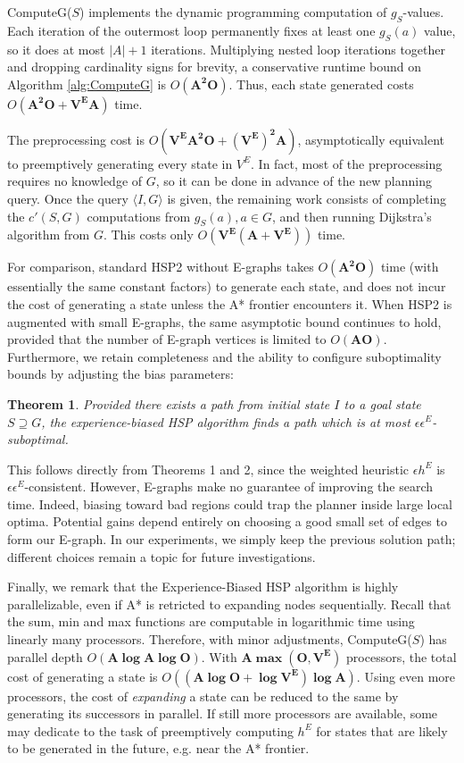 \documentclass[letterpaper]{article}
\newtheorem{thm}{Theorem}
\begin{document}
ComputeG($S$) implements the dynamic programming computation of $g_S$-values.
Each iteration of the outermost loop permanently fixes at least one $g_S(a)$ value, so it does at most $|A|+1$ iterations.
Multiplying nested loop iterations together and dropping cardinality signs for brevity, a conservative runtime bound on Algorithm \ref{alg:ComputeG} is $O(\mathbf{A^2O})$.
Thus, each state generated costs $O(\mathbf{A^2O + V^EA})$ time.

The preprocessing cost is $O(\mathbf{V^EA^2O + (V^E)^2A})$, asymptotically equivalent to preemptively generating every state in $V^E$.
In fact, most of the preprocessing requires no knowledge of $G$, so it can be done in advance of the new planning query. Once the query $\langle I,G\rangle$ is given, the remaining work consists of completing the $c'(S,G)$ computations from $g_S(a),a\in G$, and then running Dijkstra's algorithm from $G$. This costs only $O(\mathbf{V^E(A + V^E)})$ time.

For comparison, standard HSP2 without E-graphs takes $O(\mathbf{A^2O})$ time (with essentially the same constant factors) to generate each state, and does not incur the cost of generating a state unless the A* frontier encounters it.
When HSP2 is augmented with small E-graphs, the same asymptotic bound continues to hold, provided that the number of E-graph vertices is limited to $O(\mathbf{AO})$. Furthermore, we retain completeness and the ability to configure suboptimality bounds by adjusting the bias parameters:

\begin{thm}
Provided there exists a path from initial state $I$ to a goal state $S\supseteq G$, the experience-biased HSP algorithm finds a path which is at most $\epsilon\epsilon^E$-suboptimal.
\end{thm}

This follows directly from Theorems 1 and 2, since the weighted heuristic $\epsilon h^E$ is $\epsilon \epsilon^E$-consistent.
However, E-graphs make no guarantee of improving the search time. Indeed, biasing toward bad regions could trap the planner inside large local optima.
Potential gains depend entirely on choosing a good small set of edges to form our E-graph.
In our experiments, we simply keep the previous solution path; different choices remain a topic for future investigations.

Finally, we remark that the Experience-Biased HSP algorithm is highly parallelizable, even if A* is retricted to expanding nodes sequentially. Recall that the sum, min and max functions are computable in logarithmic time using linearly many processors. Therefore, with minor adjustments, ComputeG($S$) has parallel depth $O(\mathbf{A\log A\log O})$. With $\mathbf{A\max(O,V^E)}$ processors, the total cost of generating a state is $O(\mathbf{(A\log O + \log V^E)\log A})$. Using even more processors, the cost of \textit{expanding} a state can be reduced to the same by generating its successors in parallel. If still more processors are available, some may dedicate to the task of preemptively computing $h^E$ for states that are likely to be generated in the future, e.g. near the A* frontier.
\end{document}
